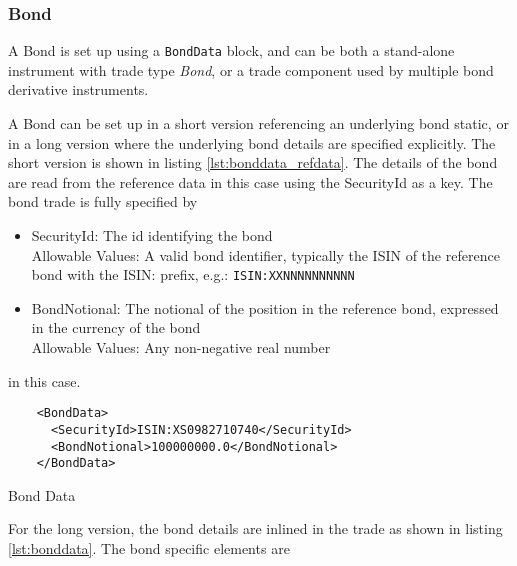 \subsubsection{Bond}
\label{ss:bond}

A Bond is set up using a {\tt BondData} block, and can be both a stand-alone instrument with trade type \emph{Bond}, or a trade component used by multiple bond derivative instruments.

A Bond can be set up in a short version referencing an underlying bond static, or in a long version where the underlying bond details are specified explicitly.
The short version is shown in listing \ref{lst:bonddata_refdata}. The details of the
bond are read from the reference data in this case using the SecurityId as a key. The bond trade is fully specified by

\begin{itemize}
\item SecurityId: The id identifying the bond\\
  Allowable Values: A valid bond identifier, typically the ISIN of the reference bond with the ISIN: prefix, e.g.: \verb+ISIN:XXNNNNNNNNNN+
\item BondNotional: The notional of the position in the reference bond, expressed in the currency of the bond\\
  Allowable Values: Any non-negative real number
\end{itemize}

in this case.

\begin{listing}[H]
\begin{verbatim}
    <BondData>
      <SecurityId>ISIN:XS0982710740</SecurityId>
      <BondNotional>100000000.0</BondNotional>
    </BondData>
\end{verbatim}
\caption{Bond Data}
\label{lst:bonddata_refdata}
\end{listing}

For the long version, the bond details are inlined in the trade as shown in listing \ref{lst:bonddata}. The bond specific elements are

